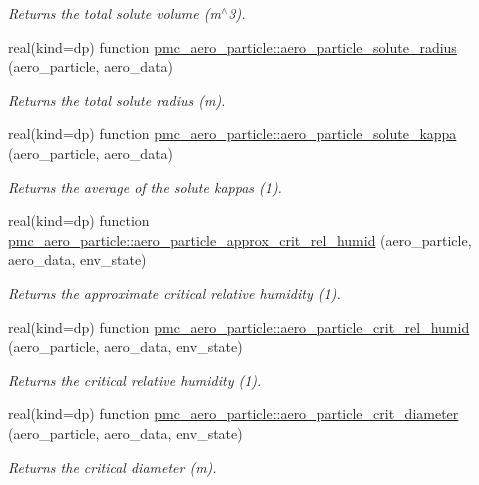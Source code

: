 \begin{DoxyCompactItemize}
\begin{DoxyCompactList}\small\item\em Returns the total solute volume (m$^\wedge$3). \end{DoxyCompactList}\item 
real(kind=dp) function \mbox{\hyperlink{namespacepmc__aero__particle_a3425f53323717a7efd796a2924c848cd}{pmc\+\_\+aero\+\_\+particle\+::aero\+\_\+particle\+\_\+solute\+\_\+radius}} (aero\+\_\+particle, aero\+\_\+data)
\begin{DoxyCompactList}\small\item\em Returns the total solute radius (m). \end{DoxyCompactList}\item 
real(kind=dp) function \mbox{\hyperlink{namespacepmc__aero__particle_a913bc45d353b6e7bca19cbdaad951b52}{pmc\+\_\+aero\+\_\+particle\+::aero\+\_\+particle\+\_\+solute\+\_\+kappa}} (aero\+\_\+particle, aero\+\_\+data)
\begin{DoxyCompactList}\small\item\em Returns the average of the solute kappas (1). \end{DoxyCompactList}\item 
real(kind=dp) function \mbox{\hyperlink{namespacepmc__aero__particle_a4a0f2be70516b5f8c48452c9685bd1f5}{pmc\+\_\+aero\+\_\+particle\+::aero\+\_\+particle\+\_\+approx\+\_\+crit\+\_\+rel\+\_\+humid}} (aero\+\_\+particle, aero\+\_\+data, env\+\_\+state)
\begin{DoxyCompactList}\small\item\em Returns the approximate critical relative humidity (1). \end{DoxyCompactList}\item 
real(kind=dp) function \mbox{\hyperlink{namespacepmc__aero__particle_a48bd3a40c0b3586c301b73bbd625a845}{pmc\+\_\+aero\+\_\+particle\+::aero\+\_\+particle\+\_\+crit\+\_\+rel\+\_\+humid}} (aero\+\_\+particle, aero\+\_\+data, env\+\_\+state)
\begin{DoxyCompactList}\small\item\em Returns the critical relative humidity (1). \end{DoxyCompactList}\item 
real(kind=dp) function \mbox{\hyperlink{namespacepmc__aero__particle_a34bb7e8e2a2ff359f0e638c74486c73d}{pmc\+\_\+aero\+\_\+particle\+::aero\+\_\+particle\+\_\+crit\+\_\+diameter}} (aero\+\_\+particle, aero\+\_\+data, env\+\_\+state)
\begin{DoxyCompactList}\small\item\em Returns the critical diameter (m). \end{DoxyCompactList}\item 

\end{DoxyCompactItemize}
